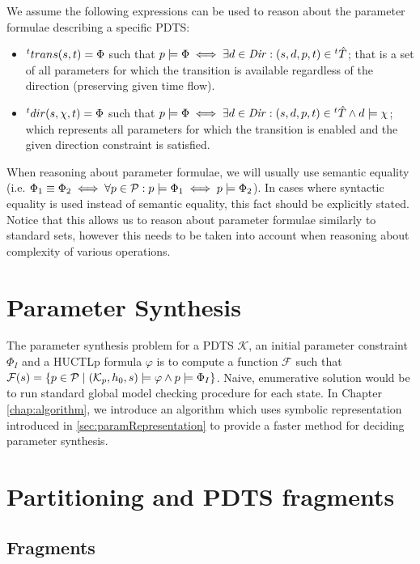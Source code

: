 We assume the following expressions can be used to reason about the parameter formulae describing a specific \ac{PDTS}:

\begin{itemize}
	\item ${}^{t}trans(s,t) = \Phi$ such that $p \models \Phi \iff \exists d \in \mathit{Dir} : (s, d, p, t) \in {}^{t}\hat{T}$; that is a set of all parameters for which the transition is available regardless of the direction (preserving given time flow).
	\item ${}^{t}dir(s, \chi ,t) = \Phi$ such that $p \models \Phi \iff \exists d \in \mathit{Dir} : (s, d, p, t) \in {}^{t}\hat{T} \land d \models \chi$; which represents all parameters for which the transition is enabled and the given direction constraint is satisfied.
\end{itemize}

When reasoning about parameter formulae, we will usually use semantic equality (i.e. $\Phi_1 \equiv \Phi_2 \iff \forall p \in \mathcal{P} : p \models \Phi_1 \iff p \models \Phi_2$). In cases where syntactic equality is used instead of semantic equality, this fact should be explicitly stated. Notice that this allows us to reason about parameter formulae similarly to standard sets, however this needs to be taken into account when reasoning about complexity of various operations.

\section{Parameter Synthesis}

The parameter synthesis problem for a \ac{PDTS} $\mathcal{K}$, an initial parameter constraint $\Phi_I$ and a \ac{HUCTLp} formula $\varphi$ is to compute a function $\mathcal{F}$ such that $\mathcal{F}(s) = \{p \in \mathcal{P} \mid (\mathcal{K}_p, h_0, s) \models \varphi \land p \models \Phi_I \}$. Naive, enumerative solution would be to run standard global model checking procedure for each state. In Chapter \ref{chap:algorithm}, we introduce an algorithm which uses symbolic representation introduced in \ref{sec:paramRepresentation} to provide a faster method for deciding parameter synthesis.

\section{Partitioning and \ac{PDTS} fragments}

\subsection{Fragments}

